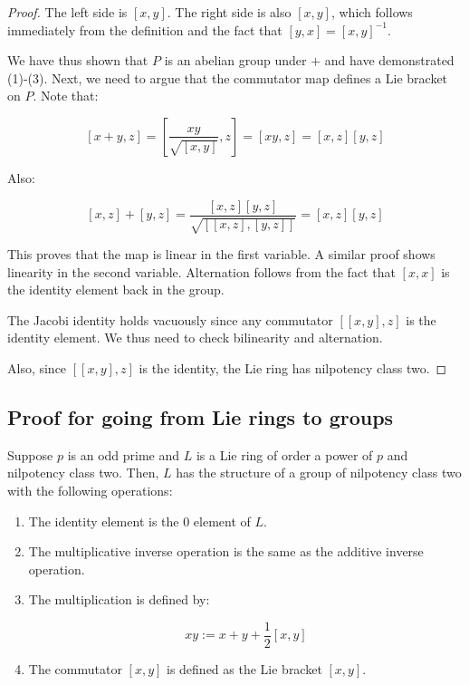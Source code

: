 \documentclass[10pt]{amsart}
\begin{document}
\begin{proof}
  The left side is $[x,y]$. The right side is also $[x,y]$, which
  follows immediately from the definition and the fact that $[y,x] =
  [x,y]^{-1}$.

  We have thus shown that $P$ is an abelian group under $+$ and have
  demonstrated (1)-(3). Next, we need to argue that the commutator map
  defines a Lie bracket on $P$.
  Note that:

  $$[x+y,z] = [\frac{xy}{\sqrt{[x,y]}},z] = [xy,z] = [x,z][y,z]$$
  
  Also:

  $$[x,z] + [y,z] = \frac{[x,z][y,z]}{\sqrt{[[x,z],[y,z]]}} = [x,z][y,z]$$

  This proves that the map is linear in the first variable. A similar
  proof shows linearity in the second variable. Alternation follows
  from the fact that $[x,x]$ is the identity element back in the
  group.

  The Jacobi identity holds vacuously since any commutator
  $[[x,y],z]$ is the identity element. We thus need to check
  bilinearity and alternation.

  Also, since $[[x,y],z]$ is the identity, the Lie ring has nilpotency
  class two.
\end{proof}

\subsection{Proof for going from Lie rings to groups}

\begin{theorem}
  Suppose $p$ is an odd prime and $L$ is a Lie ring of order a power
  of $p$ and nilpotency class two. Then, $L$ has the structure of a
  group of nilpotency class two with the following operations:

  \begin{enumerate}
  \item The identity element is the $0$ element of $L$.
  \item The multiplicative inverse operation is the same as the
    additive inverse operation.
  \item The multiplication is defined by:

    $$xy := x + y + \frac{1}{2}[x,y]$$

  \item The commutator $[x,y]$ is defined as the Lie bracket $[x,y]$.
  \end{enumerate}
\end{theorem}
\end{document}
